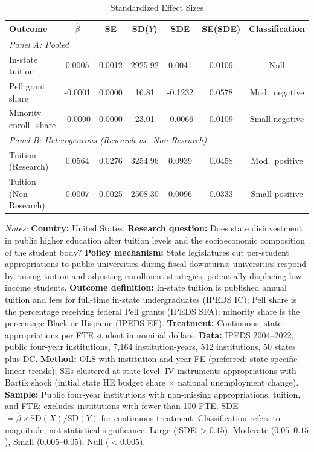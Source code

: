 \begin{table}[htbp]
\centering
\caption{Standardized Effect Sizes}
\label{tab:sde}
\footnotesize
\begin{threeparttable}
\begin{tabular}{lcccccc}
\toprule
Outcome & $\hat{\beta}$ & SE & SD($Y$) & SDE & SE(SDE) & Classification \\
\midrule
\multicolumn{7}{l}{\textit{Panel A: Pooled}} \\
In-state tuition & 0.0005 & 0.0012 & 2925.92 & 0.0041 & 0.0109 & Null \\
Pell grant share & -0.0001 & 0.0000 & 16.81 & -0.1232 & 0.0578 & Mod.\ negative \\
Minority enroll.\ share & -0.0000 & 0.0000 & 23.01 & -0.0066 & 0.0109 & Small negative \\
\midrule
\multicolumn{7}{l}{\textit{Panel B: Heterogeneous (Research vs.\ Non-Research)}} \\
Tuition (Research) & 0.0564 & 0.0276 & 3254.96 & 0.0939 & 0.0458 & Mod.\ positive \\
Tuition (Non-Research) & 0.0007 & 0.0025 & 2508.30 & 0.0096 & 0.0333 & Small positive \\
\bottomrule
\end{tabular}
\begin{tablenotes}\scriptsize
\item \textit{Notes:} \textbf{Country:} United States. \textbf{Research question:} Does state disinvestment in public higher education alter tuition levels and the socioeconomic composition of the student body? \textbf{Policy mechanism:} State legislatures cut per-student appropriations to public universities during fiscal downturns; universities respond by raising tuition and adjusting enrollment strategies, potentially displacing low-income students. \textbf{Outcome definition:} In-state tuition is published annual tuition and fees for full-time in-state undergraduates (IPEDS IC); Pell share is the percentage receiving federal Pell grants (IPEDS SFA); minority share is the percentage Black or Hispanic (IPEDS EF). \textbf{Treatment:} Continuous; state appropriations per FTE student in nominal dollars. \textbf{Data:} IPEDS 2004--2022, public four-year institutions, 7,164 institution-years, 512 institutions, 50 states plus DC. \textbf{Method:} OLS with institution and year FE (preferred: state-specific linear trends); SEs clustered at state level. IV instruments appropriations with Bartik shock (initial state HE budget share $\times$ national unemployment change). \textbf{Sample:} Public four-year institutions with non-missing appropriations, tuition, and FTE; excludes institutions with fewer than 100 FTE. SDE $= \hat{\beta} \times \text{SD}(X) / \text{SD}(Y)$ for continuous treatment. Classification refers to magnitude, not statistical significance: Large ($|$SDE$| > 0.15$), Moderate ($0.05$--$0.15$), Small ($0.005$--$0.05$), Null ($< 0.005$).
\end{tablenotes}
\end{threeparttable}
\end{table}
